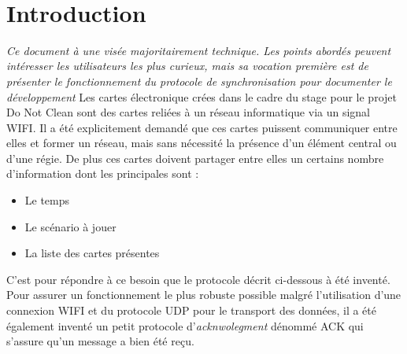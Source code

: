 \newpage
~ \thispagestyle{empty}

\tableofcontents

\newpage

\setcounter{page}{1}

\section{Introduction}
\textit{Ce document à une visée majoritairement technique. Les points abordés peuvent intéresser les utilisateurs les plus curieux, mais sa vocation première est de présenter le fonctionnement du protocole de synchronisation pour documenter le développement}\p
Les cartes électronique crées dans le cadre du stage pour le projet Do Not Clean sont des cartes reliées à un réseau informatique via un signal WIFI\citep{encyclopediaArticle_WiFi_}. Il a été explicitement demandé que ces cartes puissent communiquer entre elles et former un réseau, mais sans nécessité la présence d'un élément central ou d'une régie.\p
De plus ces cartes doivent partager entre elles un certains nombre d'information dont les principales sont : \begin{itemize}
\item Le temps
\item Le scénario à jouer
\item La liste des cartes présentes
\end{itemize}
C'est pour répondre à ce besoin que le protocole décrit ci-dessous à été inventé.\p
Pour assurer un fonctionnement le plus robuste possible malgré l'utilisation d'une connexion WIFI et du protocole UDP\citep{webpage_UserDatagramProtocol_Postela} pour le transport des données, il a été également inventé un petit protocole d'\textit{acknwolegment} dénommé ACK qui s'assure qu'un message a bien été reçu.


